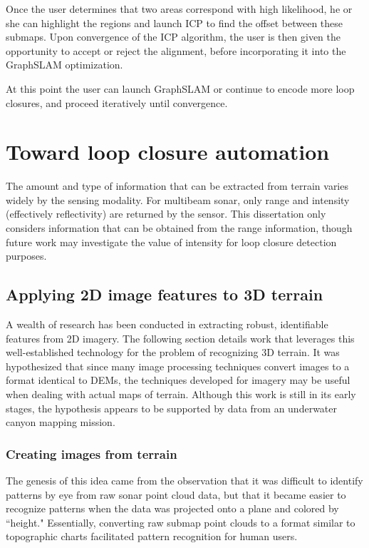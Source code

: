 Once the user determines that two areas correspond with high likelihood, he or she can highlight the regions and launch ICP to find the offset between these submaps. Upon convergence of the ICP algorithm, the user is then given the opportunity to accept or reject the alignment, before incorporating it into the GraphSLAM optimization. 

At this point the user can launch GraphSLAM or continue to encode more loop closures, and proceed iteratively until convergence.


\section{Toward loop closure automation}

The amount and type of information that can be extracted from terrain varies widely by the sensing modality. For multibeam sonar, only range and intensity (effectively reflectivity) are returned by the sensor. This dissertation only considers information that can be obtained from the range information, though future work may investigate the value of intensity for loop closure detection purposes.

\subsection{Applying 2D image features to 3D terrain}

A wealth of research has been conducted in extracting robust, identifiable features from 2D imagery. The following section details work that leverages this well-established technology for the problem of recognizing 3D terrain. It was hypothesized that since many image processing techniques convert images to a format identical to DEMs, the techniques developed for imagery may be useful when dealing with actual maps of terrain.   Although this work is still in its early stages, the hypothesis appears to be supported by data from an underwater canyon mapping mission.

\subsubsection{Creating images from terrain}

The genesis of this idea came from the observation that it was difficult to identify patterns by eye from raw sonar point cloud data, but that it became easier to recognize patterns when the data was projected onto a plane and colored by ``height." Essentially, converting raw submap point clouds to a format similar to topographic charts facilitated pattern recognition for human users.

